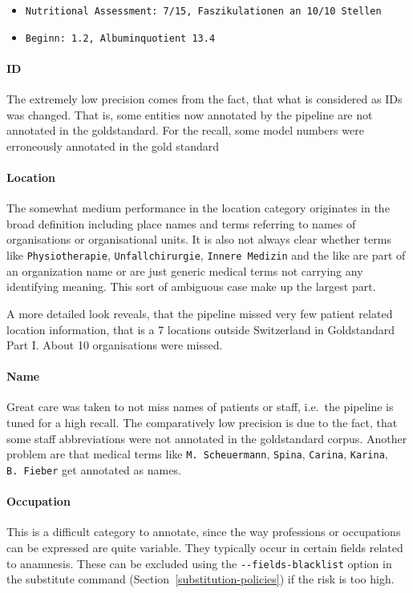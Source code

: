 \begin{itemize}
\tightlist
\item
  \texttt{Nutritional\ Assessment:\ 7/15,\ Faszikulationen\ an\ 10/10\ Stellen}
\item
  \texttt{Beginn:\ 1.2,\ Albuminquotient\ 13.4}
\end{itemize}

\paragraph{ID}\label{id}

The extremely low precision comes from the fact, that what is considered
as IDs was changed. That is, some entities now annotated by the pipeline
are not annotated in the goldstandard. For the recall, some model
numbers were erroneously annotated in the gold standard

\paragraph{Location}\label{location}

The somewhat medium performance in the location category originates in
the broad definition including place names and terms referring to names
of organisations or organisational units. It is also not always clear
whether terms like \texttt{Physiotherapie}, \texttt{Unfallchirurgie},
\texttt{Innere\ Medizin} and the like are part of an organization name
or are just generic medical terms not carrying any identifying meaning.
This sort of ambiguous case make up the largest part.

A more detailed look reveals, that the pipeline missed very few patient
related location information, that is a 7 locations outside Switzerland
in Goldstandard Part I. About 10 organisations were missed.

\paragraph{Name}\label{name}

Great care was taken to not miss names of patients or staff, i.e.~the
pipeline is tuned for a high recall. The comparatively low precision is
due to the fact, that some staff abbreviations were not annotated in the
goldstandard corpus. Another problem are that medical terms like
\texttt{M.\ Scheuermann}, \texttt{Spina}, \texttt{Carina},
\texttt{Karina}, \texttt{B.\ Fieber} get annotated as names.

\paragraph{Occupation}\label{occupation}

This is a difficult category to annotate, since the way professions or
occupations can be expressed are quite variable. They typically occur
in certain fields related to anamnesis. These can be excluded using
the \texttt{-\/-fields-blacklist} option in the substitute command
(Section~\ref{substitution-policies}) if the risk is too high.
